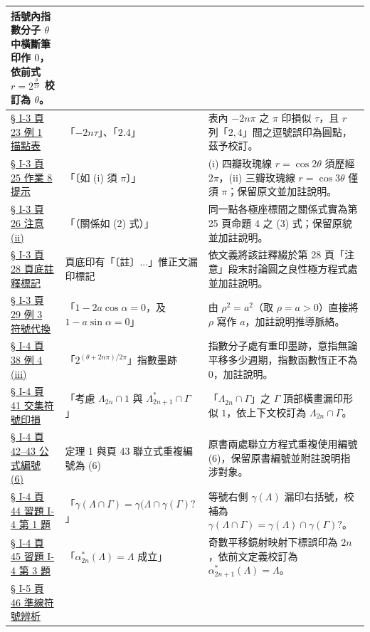 \documentclass[a4paper,12pt,twoside]{article}
\begin{document}
\begin{xltabular}{\textwidth}{|p{3.2cm}|p{3.8cm}|X|}
括號內指數分子 $\theta$ 中橫斷筆印作 $0$，依前式 $r = 2^{\frac{\theta}{2\pi}}$ 校訂為 $\theta$。 \\
\hline
\hyperref[note:b5-ch1-p23-table]{§ I-3 頁 23 例 1 描點表} & 
「$-2n\tau$」、「$2.4$」 & 
表內 $-2n\pi$ 之 $\pi$ 印損似 $\tau$，且 $r$ 列「$2, 4$」間之逗號誤印為圓點，茲予校訂。 \\
\hline
\hyperref[note:b5-ch1-p25-hw8]{§ I-3 頁 25 作業 8 提示} & 
「〔如 (i) 須 $\pi$〕」 & 
(i) 四瓣玫瑰線 $r=\cos 2\theta$ 須歷經 $2\pi$，(ii) 三瓣玫瑰線 $r=\cos 3\theta$ 僅須 $\pi$；保留原文並加註說明。 \\
\hline
\hyperref[note:b5-ch1-p26-note]{§ I-3 頁 26 注意 (ii)} & 
「（關係如 (2) 式）」 & 
同一點各極座標間之關係式實為第 25 頁命題 4 之 (3) 式；保留原貌並加註說明。 \\
\hline
\hyperref[note:b5-ch1-p28-fn]{§ I-3 頁 28 頁底註釋標記} & 
頁底印有「〔註〕...」惟正文漏印標記 & 
依文義將該註釋綴於第 28 頁「注意」段末討論圓之良性極方程式處並加註說明。 \\
\hline
\hyperref[note:b5-ch1-p29-ex3]{§ I-3 頁 29 例 3 符號代換} & 
「$1 - 2a\cos\alpha = 0$，及 $1 - a\sin\alpha = 0$」 & 
由 $\rho^2 = a^2$（取 $\rho = a > 0$）直接將 $\rho$ 寫作 $a$，加註說明推導脈絡。 \\
\hline
\hyperref[note:b5-ch1-p38-exp]{§ I-4 頁 38 例 4 (iii)} & 
「$2^{(\theta + 2n\pi)/2\pi}$」指數墨跡 & 
指數分子處有重印墨跡，意指無論平移多少週期，指數函數恆正不為 $0$，加註說明。 \\
\hline
\hyperref[note:b5-ch1-p41-gamma]{§ I-4 頁 41 交集符號印損} & 
「考慮 $\Lambda_{2n} \cap 1$ 與 $\Lambda^*_{2n+1} \cap \Gamma$」 & 
「$\Lambda_{2n} \cap \Gamma$」之 $\Gamma$ 頂部橫畫漏印形似 $1$，依上下文校訂為 $\Lambda_{2n} \cap \Gamma$。 \\
\hline
\hyperref[note:b5-ch1-p43-eq6]{§ I-4 頁 42--43 公式編號 (6)} & 
定理 1 與頁 43 聯立式重複編號為 (6) & 
原書兩處聯立方程式重複使用編號 (6)，保留原書編號並附註說明指涉對象。 \\
\hline
\hyperref[note:b5-ch1-p44-paren]{§ I-4 頁 44 習題 I-4 第 1 題} & 
「$\gamma(\Lambda \cap \Gamma) = \gamma(\Lambda \cap \gamma(\Gamma)?$」 & 
等號右側 $\gamma(\Lambda)$ 漏印右括號，校補為 $\gamma(\Lambda \cap \Gamma) = \gamma(\Lambda) \cap \gamma(\Gamma)?$。 \\
\hline
\hyperref[note:b5-ch1-p45-alpha]{§ I-4 頁 45 習題 I-4 第 3 題} & 
「$\alpha^*_{2n}(\Lambda) = \Lambda$ 成立」 & 
奇數平移鏡射映射下標誤印為 $2n$，依前文定義校訂為 $\alpha^*_{2n+1}(\Lambda) = \Lambda$。 \\
\hline
\hyperref[note:b5-ch1-p46-rho]{§ I-5 頁 46 準線符號辨析} & 

\end{xltabular}
\end{document}

